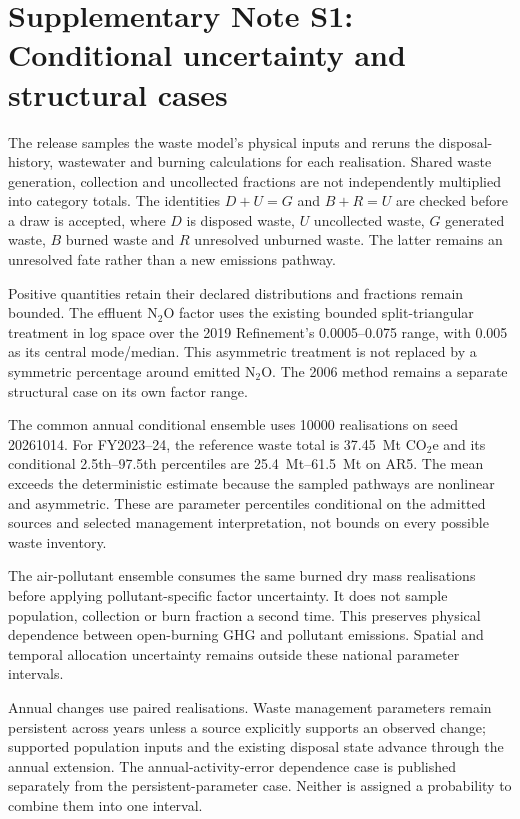 \section{Supplementary Note S1: Conditional uncertainty and structural cases}
\label{app:uncertainty}

The release samples the waste model's physical inputs and reruns the disposal-history, wastewater and burning calculations for each realisation. Shared waste generation, collection and uncollected fractions are not independently multiplied into category totals. The identities $D+U=G$ and $B+R=U$ are checked before a draw is accepted, where $D$ is disposed waste, $U$ uncollected waste, $G$ generated waste, $B$ burned waste and $R$ unresolved unburned waste. The latter remains an unresolved fate rather than a new emissions pathway.

Positive quantities retain their declared distributions and fractions remain bounded. The effluent N$_2$O factor uses the existing bounded split-triangular treatment in log space over the 2019 Refinement's 0.0005--0.075 range, with 0.005 as its central mode/median. This asymmetric treatment is not replaced by a symmetric percentage around emitted N$_2$O. The 2006 method remains a separate structural case on its own factor range.

The common annual conditional ensemble uses \num{10000} realisations on seed \num{20261014}. For FY2023--24, the reference waste total is \SI{37.45}{\mega\tonne} CO$_2$e and its conditional 2.5th--97.5th percentiles are \SIrange{25.4}{61.5}{\mega\tonne} on AR5. The mean exceeds the deterministic estimate because the sampled pathways are nonlinear and asymmetric. These are parameter percentiles conditional on the admitted sources and selected management interpretation, not bounds on every possible waste inventory.

The air-pollutant ensemble consumes the same burned dry mass realisations before applying pollutant-specific factor uncertainty. It does not sample population, collection or burn fraction a second time. This preserves physical dependence between open-burning GHG and pollutant emissions. Spatial and temporal allocation uncertainty remains outside these national parameter intervals.

Annual changes use paired realisations. Waste management parameters remain persistent across years unless a source explicitly supports an observed change; supported population inputs and the existing disposal state advance through the annual extension. The annual-activity-error dependence case is published separately from the persistent-parameter case. Neither is assigned a probability to combine them into one interval.

